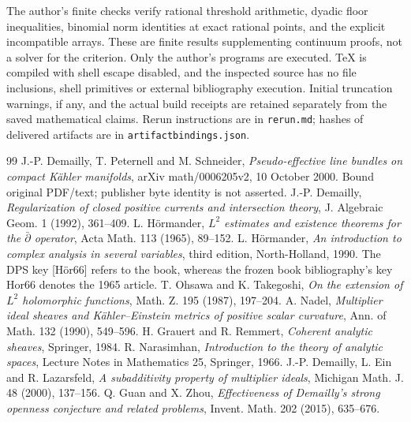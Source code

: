 \documentclass[11pt]{article}
\theoremstyle{definition}
\begin{document}
The author's finite checks verify rational threshold arithmetic,
dyadic floor inequalities, binomial norm identities at exact
rational points, and the explicit incompatible arrays. These
are finite results supplementing continuum proofs, not a solver
for the criterion. Only the author's programs are executed.
TeX is compiled with shell escape disabled, and the inspected
source has no file inclusions, shell primitives or external
bibliography execution. Initial truncation warnings, if any,
and the actual build receipts are retained separately from the
saved mathematical claims. Rerun instructions are in
\texttt{rerun.md}; hashes of delivered artifacts are in
\texttt{artifactbindings.json}.

\begin{thebibliography}{99}
 J.-P. Demailly, T. Peternell and M. Schneider,
\emph{Pseudo-effective line bundles on compact K\"ahler manifolds},
arXiv math/0006205v2, 10 October 2000. Bound original PDF/text;
publisher byte identity is not asserted.
 J.-P. Demailly, \emph{Regularization of closed positive
currents and intersection theory}, J. Algebraic Geom. 1 (1992), 361--409.
 L. H\"ormander, \emph{$L^2$ estimates and existence
theorems for the $\bar\partial$ operator}, Acta Math. 113 (1965), 89--152.
 L. H\"ormander, \emph{An introduction to complex
analysis in several variables}, third edition, North-Holland, 1990.
The DPS key [H\"or66] refers to the book, whereas the frozen book
bibliography's key Hor66 denotes the 1965 article.
 T. Ohsawa and K. Takegoshi, \emph{On the extension
of $L^2$ holomorphic functions}, Math. Z. 195 (1987), 197--204.
 A. Nadel, \emph{Multiplier ideal sheaves and K\"ahler--Einstein
metrics of positive scalar curvature}, Ann. of Math. 132 (1990), 549--596.
 H. Grauert and R. Remmert, \emph{Coherent analytic
sheaves}, Springer, 1984.
 R. Narasimhan, \emph{Introduction to the theory of
analytic spaces}, Lecture Notes in Mathematics 25, Springer, 1966.
 J.-P. Demailly, L. Ein and R. Lazarsfeld,
\emph{A subadditivity property of multiplier ideals}, Michigan
Math. J. 48 (2000), 137--156.
 Q. Guan and X. Zhou, \emph{Effectiveness of Demailly's
strong openness conjecture and related problems}, Invent. Math.
202 (2015), 635--676.
\end{thebibliography}
\end{document}

